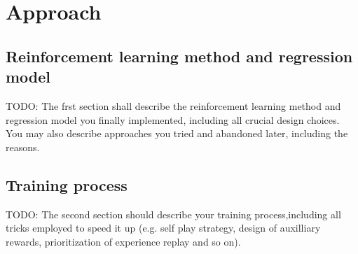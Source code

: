 \section{Approach} 
\label{approach}

\subsection{Reinforcement learning method and regression model} 
\label{ch:approachA}

TODO: The frst section shall describe the reinforcement learning method and regression model you finally implemented, including all crucial design choices. You may also describe approaches you tried and abandoned later, including the reasons.

\subsection{Training process} 
\label{ch:approachB}

TODO: The second section should describe your training process,including all tricks employed to speed it up (e.g. self play strategy, design of auxilliary rewards, prioritization of experience replay and so on).